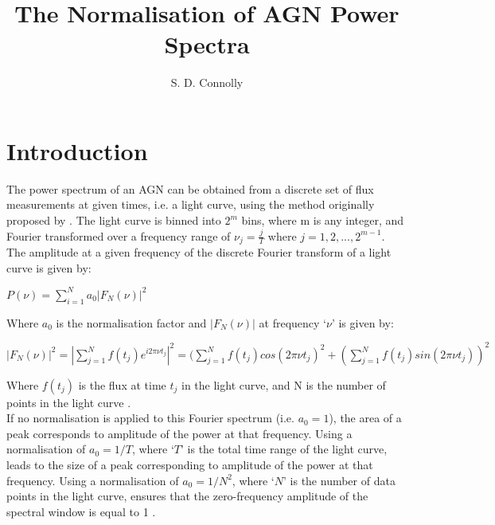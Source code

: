 \documentclass[letters,useAMS,usenatbib]{samnote}
\title[The Normalisation of AGN Power Spectra]{The Normalisation of AGN Power Spectra}
\author[S. D. Connolly]{S. D. Connolly}
\begin{document}
\maketitle

\label{firstpage}



\section{Introduction}

The power spectrum of an AGN can be obtained from a discrete set of flux measurements at given times, i.e. a light curve, using the method originally proposed by \citet{deeming}. The light curve is binned into $2^m$ bins, where m is any integer, and Fourier transformed over a frequency range of $\nu_j = \displaystyle\frac{j}{T}$ where $j = 1,2,... ,2^{m-1}$. The amplitude at a given frequency of the discrete Fourier transform of a light curve is given by: 

\vspace{\baselineskip}
$P(\nu)= \sum\limits_{i=1}^N a_0 |F_N(\nu)|^2 $\\
\vspace{\baselineskip}

\setlength\parindent{0pt}
Where $a_0$ is the normalisation factor and $|F_N(\nu)|$ at frequency `$\nu$' is given by:

\vspace{\baselineskip}
\setlength\parindent{20pt}
$|F_N(\nu)|^2 =  |\sum\limits_{j=1}^N f(t_j) e^{i 2 \pi \nu t_j}|^2
=(\sum\limits_{j=1}^N f(t_j) cos(2 \pi \nu t_j)^2 + 
(\sum\limits_{j=1}^N f(t_j) sin(2 \pi \nu t_j))^2$\\
\vspace{\baselineskip}

\setlength\parindent{0pt}
Where $f(t_j)$ is the flux at time $t_j$ in the light curve, and N is the number of points in the light curve \citep{summons}.\\

If no normalisation is applied to this Fourier spectrum (i.e. $a_0 = 1$), the area of a peak corresponds to amplitude of the power at that frequency. Using a normalisation of $a_0 = 1/T$, where `$T$' is the total time range of the light curve, leads to the size of a peak corresponding to amplitude of the power at that frequency. Using a normalisation of $a_0 = 1/N^2$, where `$N$' is the number of data points in the light curve, ensures that the zero-frequency amplitude of the spectral window is equal to 1 \citep{deeming}.   
  
\end{document}
